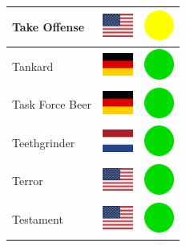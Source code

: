 \documentclass[12pt, a4paper, twoside]{report}
\begin{document}
\begin{center}
\begin{longtable}{|p{5cm}|p{2cm}|p{2cm}|}
Take Offense & \includegraphics[width=1cm]{4x3/us} & \includegraphics[width=1cm]{likes/m} \\ \hline
Tankard & \includegraphics[width=1cm]{4x3/de} & \includegraphics[width=1cm]{likes/y} \\ \hline
Task Force Beer & \includegraphics[width=1cm]{4x3/de} & \includegraphics[width=1cm]{likes/y} \\ \hline
Teethgrinder & \includegraphics[width=1cm]{4x3/nl} & \includegraphics[width=1cm]{likes/y} \\ \hline
Terror & \includegraphics[width=1cm]{4x3/us} & \includegraphics[width=1cm]{likes/y} \\ \hline
Testament & \includegraphics[width=1cm]{4x3/us} & \includegraphics[width=1cm]{likes/y} \\ \hline

\end{longtable}
\end{center}
\end{document}
